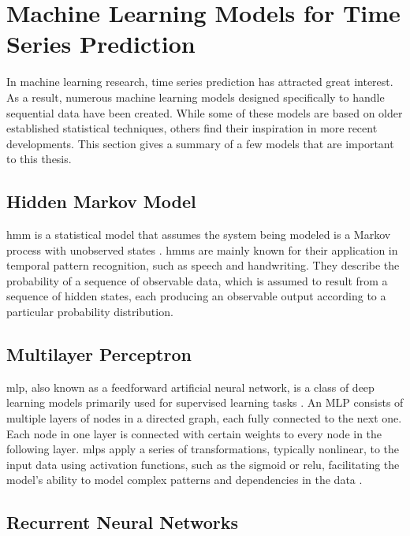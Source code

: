
\section{Machine Learning Models for Time Series Prediction}

In machine learning research, time series prediction has attracted great interest.
As a result, numerous machine learning models designed specifically to handle sequential data have been created.
While some of these models are based on older established statistical techniques, others find their inspiration in more recent developments.
This section gives a summary of a few models that are important to this thesis.

\subsection{Hidden Markov Model}

\ac{hmm} is a statistical model that assumes the system being modeled is a Markov process with unobserved states \cite{hmm-rabiner-1989}.
\acp{hmm} are mainly known for their application in temporal pattern recognition, such as speech and handwriting.
They describe the probability of a sequence of observable data, which is assumed to result from a sequence of hidden states, each producing an observable output according to a particular probability distribution.

\subsection{Multilayer Perceptron}

\ac{mlp}, also known as a feedforward artificial neural network, is a class of deep learning models primarily used for supervised learning tasks \cite{mlp-backpropagation-rumelhart}.
An MLP consists of multiple layers of nodes in a directed graph, each fully connected to the next one.
Each node in one layer is connected with certain weights to every node in the following layer.
\acp{mlp} apply a series of transformations, typically nonlinear, to the input data using activation functions, such as the sigmoid or \ac{relu}, facilitating the model's ability to model complex patterns and dependencies in the data \cite{goodfellow_deep_2016}.

\subsection{Recurrent Neural Networks}

